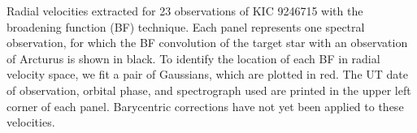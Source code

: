 \label{fig:bffig} Radial velocities extracted for 23 observations of KIC 9246715 with the broadening function (BF) technique. Each panel represents one spectral observation, for which the BF convolution of the target star with an observation of Arcturus is shown in black. To identify the location of each BF in radial velocity space, we fit a pair of Gaussians, which are plotted in red. The UT date of observation, orbital phase, and spectrograph used are printed in the upper left corner of each panel. Barycentric corrections have not yet been applied to these velocities.